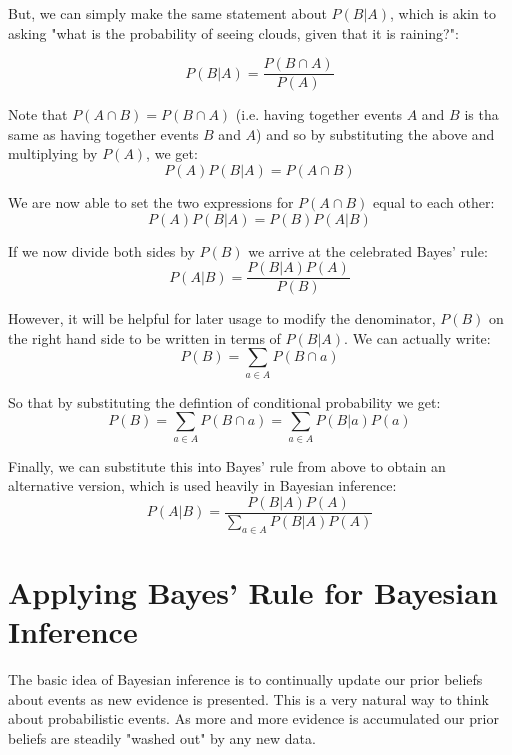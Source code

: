 But, we can simply make the same statement about $P(B|A)$, which is akin to asking "what is the probability of seeing clouds, given that it is raining?":

\begin{equation}
  P(B|A)=\frac{P(B\cap A)}{P(A)}
\end{equation}

Note that $P(A\cap B) = P(B\cap A)$ (i.e. having together events $A$ and $B$ is tha same as having together events $B$ and $A$) and so by substituting the above and multiplying by $P(A)$, we get:
\begin{equation}
  P(A)P(B|A)=P(A\cap B)
\end{equation}

We are now able to set the two expressions for $P(A\cap B)$ equal to each other:
\begin{equation}
  P(A)P(B|A)=P(B)P(A|B)
\end{equation}

If we now divide both sides by $P(B)$ we arrive at the celebrated Bayes' rule:
\begin{equation}
  P(A|B)=\frac{P(B|A)P(A)}{P(B)}
\end{equation}

However, it will be helpful for later usage to modify the denominator, $P(B)$ on the right hand side to be written in terms of $P(B|A)$. We can actually write:
\begin{equation}
  P(B)=\sum_{a\in A}P(B\cap a)
\end{equation}


So that by substituting the defintion of conditional probability we get:
\begin{equation}
  P(B)=\sum_{a\in A}P(B\cap a) = \sum_{a\in A}P(B|a)P(a)
\end{equation}

Finally, we can substitute this into Bayes' rule from above to obtain an alternative version, which is used heavily in Bayesian inference:
\begin{equation}
  P(A|B)=\frac{P(B|A)P(A)}{\sum_{a\in A}P(B|A)P(A)}
\end{equation}

\section{Applying Bayes' Rule for Bayesian Inference}
The basic idea of Bayesian inference is to continually update our prior beliefs about events as new evidence is presented. This is a very natural way to think about probabilistic events. As more and more evidence is accumulated our prior beliefs are steadily "washed out" by any new data.

